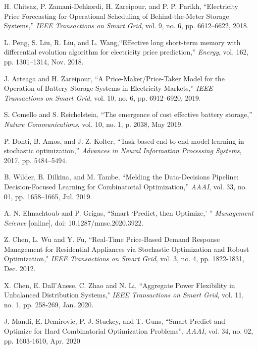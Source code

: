 \documentclass[journal]{IEEEtran}
\begin{document}
\ifCLASSOPTIONcaptionsoff
  \newpage
\fi



\begin{thebibliography}{2}

H. Chitsaz, P. Zamani-Dehkordi, H. Zareipour, and P. P. Parikh, “Electricity Price Forecasting for Operational Scheduling of Behind-the-Meter Storage Systems,” \emph{IEEE Transactions on Smart Grid}, vol. 9, no. 6, pp. 6612–6622, 2018.

L. Peng, S. Liu, R. Liu, and L. Wang,``Effective long short-term memory with differential evolution algorithm for electricity price prediction,” \emph{Energy}, vol. 162, pp. 1301–1314, Nov. 2018.

J. Arteaga and H. Zareipour, “A Price-Maker/Price-Taker Model for the Operation of Battery Storage Systems in Electricity Markets,” \emph{IEEE Transactions on Smart Grid}, vol. 10, no. 6, pp. 6912–6920, 2019.

S. Comello and S. Reichelstein, “The emergence of cost effective battery storage,” \emph{Nature Communications}, vol. 10, no. 1, p. 2038, May 2019.

P. Donti, B. Amos, and J. Z. Kolter, “Task-based end-to-end model learning in stochastic optimization,” \emph{Advances in Neural Information Processing Systems}, 2017, pp. 5484–5494.

B. Wilder, B. Dilkina, and M. Tambe, “Melding the Data-Decisions Pipeline: Decision-Focused Learning for Combinatorial Optimization,” \emph{AAAI}, vol. 33, no. 01, pp. 1658–1665, Jul. 2019.

A. N. Elmachtoub and P. Grigas, ``Smart `Predict, then Optimize,’ ” \emph{Management Science} [online], doi: 10.1287/mnsc.2020.3922.

Z. Chen, L. Wu and Y. Fu, “Real-Time Price-Based Demand Response Management for Residential Appliances via Stochastic Optimization and Robust Optimization," \emph{IEEE Transactions on Smart Grid}, vol. 3, no. 4, pp. 1822-1831, Dec. 2012.

X. Chen, E. Dall’Anese, C. Zhao and N. Li, “Aggregate Power Flexibility in Unbalanced Distribution Systems," \emph{IEEE Transactions on Smart Grid}, vol. 11, no. 1, pp. 258-269, Jan. 2020.

J. Mandi, E. Demirovic, P. J. Stuckey, and T. Guns, “Smart Predict-and-Optimize for Hard Combinatorial Optimization Problems”, \emph{AAAI}, vol. 34, no. 02, pp. 1603-1610, Apr. 2020


\end{thebibliography}
\end{document}
